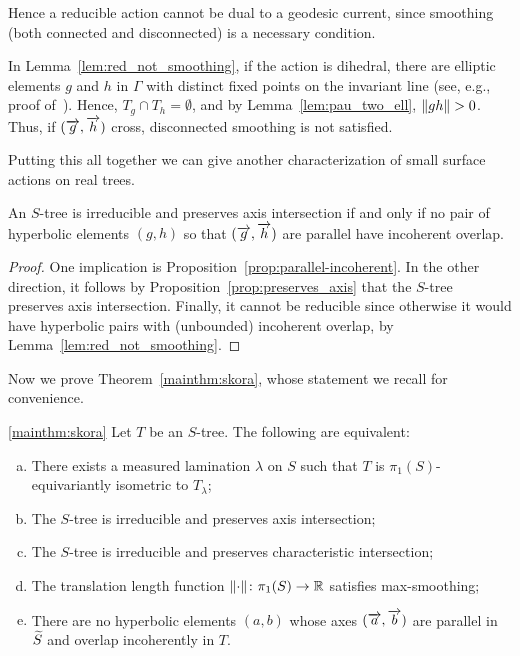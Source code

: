 Hence a reducible action cannot be dual to a geodesic current, since
smoothing (both connected and disconnected) is a necessary condition.

\begin{remark}
  In Lemma~\ref{lem:red_not_smoothing}, if the action is dihedral,
  there are elliptic elements $g$ and $h$ in $\Gamma$ with distinct
  fixed points on the invariant line (see, e.g., proof
  of~\cite[Theorem~2.2]{CM87:GroupActions}). Hence,
  $T_g \cap T_h = \emptyset$, and by Lemma~\ref{lem:pau_two_ell},
  $\lVert gh\rVert>0$. Thus, if $(\overrightarrow{g},\overrightarrow{h})$ cross, disconnected
  smoothing is not satisfied.
\end{remark}

Putting this all together we can give another characterization of small surface actions on real trees.

\begin{theorem}
An $S$-tree is irreducible and preserves axis intersection if and only
if no pair of hyperbolic elements $(g,h)$ so that $(\overrightarrow{g},\overrightarrow{h})$ are
parallel have incoherent
overlap.
\label{thm:axis_incoherent_characterization}
\end{theorem}
\begin{proof}
One implication is Proposition~\ref{prop:parallel-incoherent}.
In the other direction, it follows by
Proposition~\ref{prop:preserves_axis} that the $S$-tree
preserves axis intersection. Finally, it cannot be reducible since
otherwise it would have hyperbolic pairs with (unbounded) incoherent
overlap, by Lemma~\ref{lem:red_not_smoothing}.
\end{proof}


Now we prove Theorem~\ref{mainthm:skora}, whose statement we recall
for convenience.

\begin{taggedthm}{\ref{mainthm:skora}}
Let $T$ be an $S$-tree. The following are equivalent:
\begin{enumerate}[(a)]
\item There exists a measured lamination $\lambda$ on $S$ such that
$T$ is $\pi_1(S)$-equivariantly isometric to $T_\lambda$;
\item The $S$-tree is irreducible and preserves axis intersection;
\item The $S$-tree is irreducible and preserves characteristic intersection;
\item The translation length function
$\lVert\cdot\rVert\colon \pi_1(S)\to\mathbb{R}$ satisfies max-smoothing;
\item   There are no hyperbolic elements $(a,b)$ whose axes $(\overrightarrow{a},\overrightarrow{b})$ are
parallel in $\widetilde{S}$ and overlap incoherently in $T$.
\end{enumerate}
\end{taggedthm}


